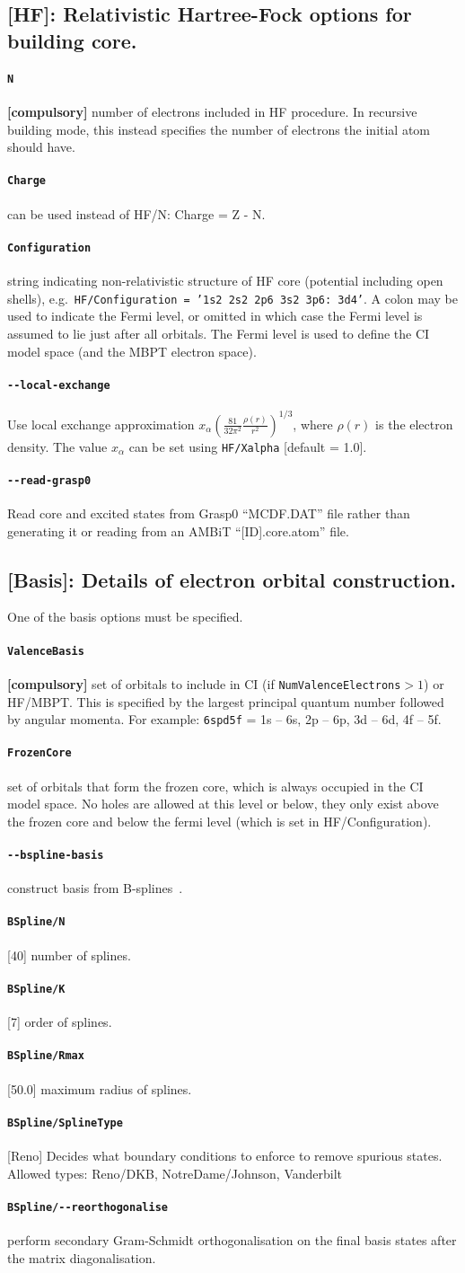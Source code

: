 \documentclass[a4paper,11pt]{article}
\newcommand{\option}[1]{\paragraph{\texttt{#1}}}
\newcommand{\code}[1]{\texttt{#1}}
\begin{document}
\subsection*{[HF]: Relativistic Hartree-Fock options for building core.}
\option{N} \textbf{[compulsory]} number of electrons included in HF procedure. In recursive building mode, this instead specifies the number of electrons the initial atom should have.
\option{Charge} can be used instead of HF/N: Charge = Z - N.
\option{Configuration} string indicating non-relativistic structure of HF core (potential including open shells), e.g.~\texttt{HF/Configuration = '1s2 2s2 2p6 3s2 3p6: 3d4'}. A colon may be used to indicate the Fermi level, or omitted in which case the Fermi level is assumed to lie just after all orbitals. The Fermi level is used to define the CI model space (and the MBPT electron space).
\option{-{}-local-exchange} Use local exchange approximation $x_\alpha \left(\frac{81}{32\pi^2} \frac{\rho(r)}{r^2}\right)^{1/3}$, where $\rho(r)$ is the electron density. The value $x_\alpha$ can be set using \code{HF/Xalpha} [default = 1.0].
\option{-{}-read-grasp0} Read core and excited states from Grasp0 ``MCDF.DAT'' file rather than generating it or reading from an AMBiT ``[ID].core.atom'' file.

\subsection*{[Basis]: Details of electron orbital construction.}
One of the basis options must be specified.
\option{ValenceBasis} \textbf{[compulsory]} set of orbitals to include in CI (if \mbox{\texttt{NumValenceElectrons}$>1$}) or HF/MBPT. This is specified by the largest principal quantum number followed by angular momenta. For example:
\texttt{6spd5f} = 1s -- 6s, 2p -- 6p, 3d -- 6d, 4f -- 5f.

\option{FrozenCore} set of orbitals that form the frozen core, which is always occupied in the CI model space. No holes are allowed at this level or below, they only exist above the frozen core and below the fermi level (which is set in HF/Configuration).

\option{-{}-bspline-basis} construct basis from B-splines~\cite{johnson88pra}.
\option{BSpline/N} [40] number of splines.
\option{BSpline/K} [7]  order of splines.
\option{BSpline/Rmax} [50.0] maximum radius of splines.
\option{BSpline/SplineType} [Reno] Decides what boundary conditions to enforce to remove spurious states. Allowed types: Reno/DKB, NotreDame/Johnson, Vanderbilt
\option{BSpline/-{}-reorthogonalise} perform secondary Gram-Schmidt orthogonalisation on the final basis states after the matrix diagonalisation.
\end{document}
